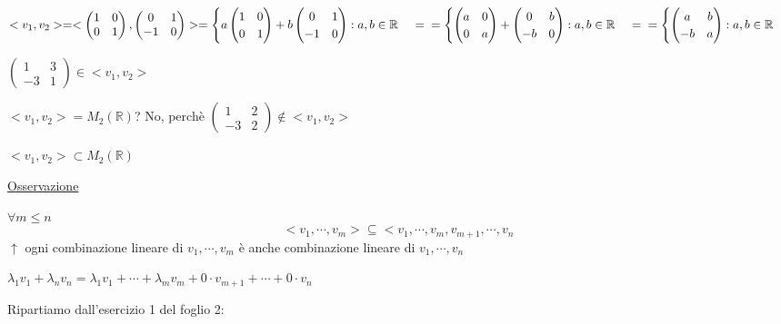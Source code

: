 \documentclass{article}
\newcommand{\ul}[1]{\underline{#1}}
\newcommand{\R}{\mathbb{R}}
\begin{document}
\begin{itemize}
		      $<v_1,v_2>=<\begin{pmatrix}1&0\\0&1\end{pmatrix},\begin{pmatrix}0&1\\-1&0\end{pmatrix}>=\begin{cases}a\begin{pmatrix}1&0\\0&1\end{pmatrix}+b\begin{pmatrix}0&1\\-1&0\end{pmatrix}:a,b\in\R\end{cases}=\\=\begin{cases}\begin{pmatrix}a&0\\0&a\end{pmatrix}+\begin{pmatrix}0&b\\-b&0\end{pmatrix}:a,b\in\R\end{cases}=\\=\begin{cases}\begin{pmatrix}a&b\\-b&a\end{pmatrix}:a,b\in\R\end{cases}$

		      $\begin{pmatrix}1&3\\-3&1\end{pmatrix}\in<v_1,v_2>$

		      $<v_1,v_2>=M_2(\R)$? No, perchè $\begin{pmatrix}1&2\\-3&2\end{pmatrix}\not\in<v_1,v_2>$

		      $<v_1,v_2>\subset M_2(\R)$

		      \ul{Osservazione}

		      $\forall m\leq n$
		      $$<v_1,\cdots,v_m>\subseteq <v_1,\cdots,v_m,v_{m+1},\cdots,v_n$$
		      $\uparrow$ ogni combinazione lineare di $v_1,\cdots,v_m$ è anche combinazione lineare di $v_1,\cdots,v_n$

		      $\lambda_1v_1+\lambda_nv_n=\lambda_1v_1+\cdots+\lambda_mv_m+0\cdot v_{m+1}+\cdots+0\cdot v_n$
	\end{itemize}
	Ripartiamo dall'esercizio 1 del foglio 2:
\end{document}
